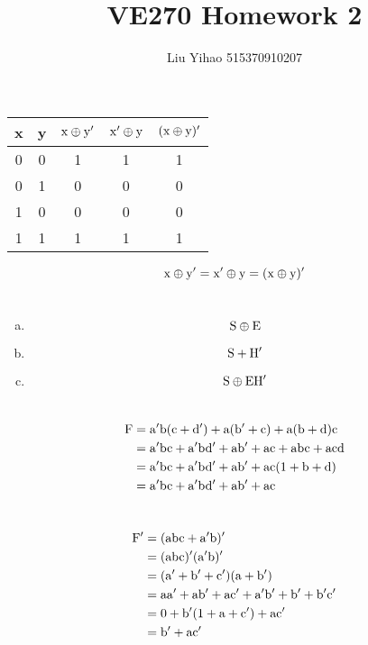 \documentclass{article}
\title{VE270 Homework 2}
\author{Liu Yihao 515370910207}
\date{}
\begin{document}
\maketitle

\section{}
\begin{center}
\begin{tabular}{cc|ccc}
x&y&$\rm x\oplus y'$&$\rm x'\oplus y$&$\rm(x \oplus y)'$\\
\hline
0&0&1&1&1\\
0&1&0&0&0\\
1&0&0&0&0\\
1&1&1&1&1\\
\end{tabular}
\end{center}
$$\rm x\oplus y'=x'\oplus y=(x\oplus y)'$$

\section{}
\begin{enumerate}[(a)]
\item $$\rm S\oplus E$$
\item $$\rm S+H'$$
\item $$\rm S\oplus EH'$$
\end{enumerate}

\section{}
\begin{align*}
\rm F&=\rm a'b(c+d')+a(b'+c)+a(b+d)c\\
&=\rm a'bc+a'bd'+ab'+ac+abc+acd\\
&=\rm a'bc+a'bd'+ab'+ac(1+b+d)\\
&=\rm a'bc+a'bd'+ab'+ac
\end{align*}

\section{}
\begin{align*}
\rm F'&=\rm (abc+a'b)'\\
&=\rm (abc)'(a'b)'\\
&=\rm (a'+b'+c')(a+b')\\
&=\rm aa'+ab'+ac'+a'b'+b'+b'c'\\
&=\rm 0+b'(1+a+c')+ac'\\
&=\rm b'+ac'
\end{align*}
\end{document}
